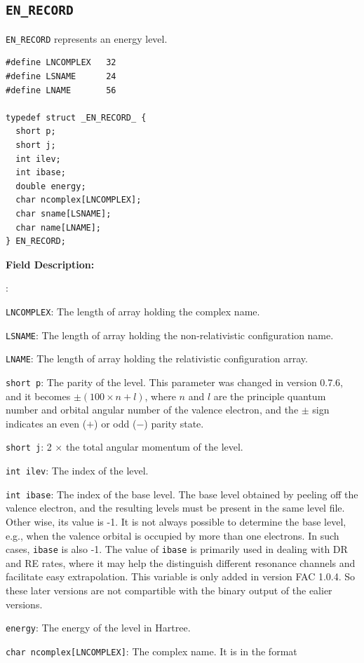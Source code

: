 \documentclass[twoside,letterpaper]{refrep}
\newenvironment{dbdesc}{\textbf{Field Description:} \begin{list}
	{:}{\setlength{\labelwidth}{2in}
	   \setlength{\leftmargin}{2in}
	   \setlength{\labelsep}{0.1in}
	   \setlength{\rightmargin}{0.2in}}}
	{\end{list}}
\begin{document}
\subsection{\texttt{EN\_RECORD}}
\texttt{EN\_RECORD} represents an energy level.

\begin{verbatim}
#define LNCOMPLEX   32
#define LSNAME      24
#define LNAME       56

typedef struct _EN_RECORD_ {
  short p;
  short j;
  int ilev;
  int ibase;
  double energy;
  char ncomplex[LNCOMPLEX];
  char sname[LSNAME];
  char name[LNAME];
} EN_RECORD;
\end{verbatim}

\begin{dbdesc}
\item[\texttt{LNCOMPLEX}:] The length of array holding the complex name.
\item[\texttt{LSNAME}:] The length of array holding the non-relativistic
configuration name.
\item[\texttt{LNAME}:] The length of array holding the relativistic
configuration array.
\item[\texttt{short p}:] The parity of the level. This parameter was changed
in version 0.7.6, and it becomes $\pm(100\times n + l)$, where $n$ and $l$ are
the principle quantum number and orbital angular number of the valence
electron, and the $\pm$ sign indicates an even ($+$) or odd ($-$) parity state.
\item[\texttt{short j}:] 2 $\times$ the total angular momentum of the level.
\item[\texttt{int ilev}:] The index of the level.
\item[\texttt{int ibase}:] The index of the base level. The base level
  obtained by peeling off the valence electron, and the resulting levels must
  be present in the same level file. Other wise, its value is -1. It is not
  always possible to determine the base level, e.g., when the valence orbital
  is occupied by more than one electrons. In such cases, \texttt{ibase} is
  also -1. The value of \texttt{ibase} is primarily used in dealing with DR
  and RE rates, where it may help the distinguish different resonance channels
  and facilitate easy extrapolation. This variable is only added in version
  FAC 1.0.4. So these later versions are not compartible with the binary
  output of the ealier versions.
\item[\texttt{energy}:] The energy of the level in Hartree.
\item[\texttt{char ncomplex[LNCOMPLEX]}:] The complex name. It is in the format

\end{dbdesc}
\end{document}

